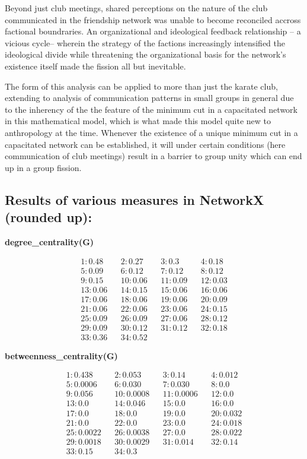 \documentclass[11pt]{article}
\begin{document}
Beyond just club meetings, shared perceptions on the nature of the club communicated
in the friendship network was unable to become reconciled accross factional boundraries.
An organizational and ideological feedback relationship -- a vicious cycle-- wherein the
strategy of the factions increasingly intensified the ideological divide while threatening
the organizational basis for the network's existence itself made the fission all but
inevitable.

The form of this analysis can be applied to more than just the karate club, extending to
analysis of communication patterns in small groups in general due to the inherency of the
the feature of the minimum cut in a capacitated network in this mathematical model, which
is what made this model quite new to anthropology at the time. Whenever the existence of
a unique minimum cut in a capacitated network can be established, it will under certain
conditions (here communication of club meetings) result in a barrier to group unity which
can end up in a group fission.

\subsection{ Results of various measures in NetworkX (rounded up): }
\textbf{degree\_centrality(G)}

\begin{align*}
1: 0.48 && 2: 0.27 && 3: 0.3 && 4: 0.18 \\
5: 0.09 && 6: 0.12 && 7: 0.12 && 8: 0.12 \\
9: 0.15 && 10: 0.06 && 11: 0.09 && 12: 0.03 \\
13: 0.06 && 14: 0.15 && 15: 0.06 && 16: 0.06 \\
17: 0.06 && 18: 0.06 && 19: 0.06 && 20: 0.09 \\
21: 0.06 && 22: 0.06 && 23: 0.06 && 24: 0.15 \\
25: 0.09 && 26: 0.09 && 27: 0.06 && 28: 0.12 \\
29: 0.09 && 30: 0.12 && 31: 0.12 && 32: 0.18 \\
33: 0.36 && 34: 0.52 && &&
\end{align*}

\textbf{betweenness\_centrality(G)}

\begin{align*}
1: 0.438 && 2: 0.053 && 3: 0.14 && 4: 0.012 \\
5: 0.0006 && 6: 0.030 && 7: 0.030 && 8: 0.0 \\
9: 0.056 && 10: 0.0008 && 11: 0.0006 && 12: 0.0 \\
13: 0.0 && 14: 0.046 && 15: 0.0 && 16: 0.0 \\
17: 0.0 && 18: 0.0 && 19: 0.0 && 20: 0.032 \\
21: 0.0 && 22: 0.0 && 23: 0.0 && 24: 0.018 \\
25: 0.0022 && 26: 0.0038 && 27: 0.0 && 28: 0.022 \\
29: 0.0018 && 30: 0.0029 && 31: 0.014 && 32: 0.14 \\
33: 0.15 && 34: 0.3 && && 
\end{align*}
\end{document}
